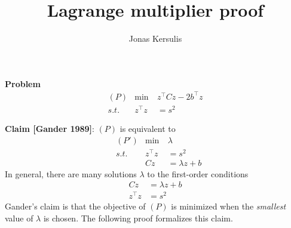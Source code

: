 \documentclass[10pt,letterpaper]{article}
\author{Jonas Kersulis}
\title{Lagrange multiplier proof}
\begin{document}
\maketitle

\textbf{Problem}
\begin{align*}
&(P) &\min~ & z^\top C z - 2b^\top z & \\
& s.t. & z^\top z &= s^2
\end{align*}

\textbf{Claim [Gander 1989]}: $(P)$ is equivalent to
\begin{align*}
&(P') & \min~ & \lambda  \\
& s.t.& z^\top z &= s^2 \\
&& Cz &= \lambda z + b
\end{align*}
In general, there are many solutions $\lambda$ to the first-order conditions
\begin{subequations}\label{eq:first}
\begin{align}
\label{eq:first1}Cz &= \lambda z + b \\
\label{eq:first2}z^\top z &= s^2
\end{align}
\end{subequations}
Gander's claim is that the objective of $(P)$ is minimized when the \textit{smallest} value of $\lambda$ is chosen. The following proof formalizes this claim.
\end{document}
